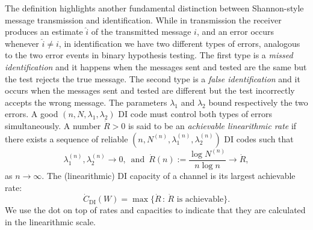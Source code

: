 \documentclass[10pt, conference]{IEEEtran}
\newcommand{\1}{\mathds{1}}
\begin{document}
The definition highlights another fundamental distinction between Shannon-style message transmission and identification. While in transmission the receiver produces an estimate $\hat{i}$ of the transmitted message $i$, and an error occurs whenever $\hat{i}\neq i$, in identification we have two different types of errors, analogous to the two error events in binary hypothesis testing. The first type is a \emph{missed identification} and it happens when the messages sent and tested are the same but the test rejects the true message. The second type is a \emph{false identification} and it occurs when the messages sent and tested are different but the test incorrectly accepts the wrong message. The parameters $\lambda_1$ and $\lambda_2$ bound respectively the two errors. A good $(n,N,\lambda_1,\lambda_2)$ DI code must control both types of errors simultaneously.
%
A number $\dot R>0$ is said to be an \emph{achievable linearithmic rate} if there exists a sequence of reliable
$(n,N^{(n)},\lambda_1^{(n)},\lambda_2^{(n)})$ 
DI codes such that
\begin{equation}\label{eq:achievable_rate_intro}
\lambda_1^{(n)},\lambda_2^{(n)} \rightarrow  0,
\,\,\, \text{and}\,\,\,
\dot R(n):=\frac{\log N^{(n)}}{n\log n} \rightarrow \dot{R},
\end{equation}
as $n\to \infty$.
The (linearithmic) DI capacity of a channel is its largest achievable rate:
\begin{equation}\label{eq:def_capacity}
\dot{C}_{\mathrm{DI}}(W)=
\max\bigl\{\dot{R}\,:\,\dot{R}\text{ is achievable}\bigr\}.
\end{equation}
We use the dot on top of rates and capacities to indicate that they are calculated in the linearithmic scale.
\end{document}
